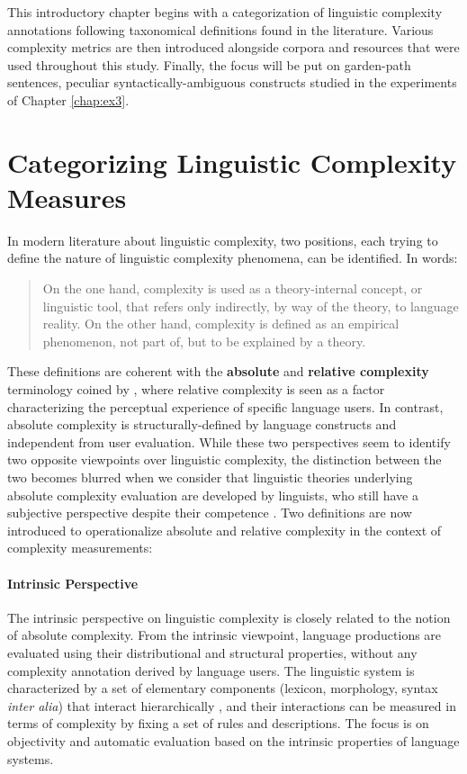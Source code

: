 \documentclass[a4paper, nobind]{templates/ociamthesis}
\begin{document}
This introductory chapter begins with a categorization of linguistic complexity annotations following taxonomical definitions found in the literature. Various complexity metrics are then introduced alongside corpora and resources that were used throughout this study. Finally, the focus will be put on garden-path sentences, peculiar syntactically-ambiguous constructs studied in the experiments of Chapter \ref{chap:ex3}.

\hypertarget{subchap:categorizing}{%
\section{Categorizing Linguistic Complexity Measures}\label{subchap:categorizing}}

In modern literature about linguistic complexity, two positions, each trying to define the nature of linguistic complexity phenomena, can be identified. In \textcite{kusters-2008-complexity} words:

\begin{quote}
On the one hand, complexity is used as a theory-internal concept, or linguistic tool, that refers only indirectly, by way of the theory, to language reality. On the other hand, complexity is defined as an empirical phenomenon, not part of, but to be explained by a theory.
\end{quote}

\noindent
These definitions are coherent with the \textbf{absolute} and \textbf{relative complexity} terminology coined by \textcite{miestamo-2004-feasibility}, where relative complexity is seen as a factor characterizing the perceptual experience of specific language users. In contrast, absolute complexity is structurally-defined by language constructs and independent from user evaluation. While these two perspectives seem to identify two opposite viewpoints over linguistic complexity, the distinction between the two becomes blurred when we consider that linguistic theories underlying absolute complexity evaluation are developed by linguists, who still have a subjective perspective despite their competence \autocite{kusters-2003-linguistic}. Two definitions are now introduced to operationalize absolute and relative complexity in the context of complexity measurements:

\paragraph{Intrinsic Perspective} The intrinsic perspective on linguistic complexity is closely related to the notion of absolute complexity. From the intrinsic viewpoint, language productions are evaluated using their distributional and structural properties, without any complexity annotation derived by language users. The linguistic system is characterized by a set of elementary components (lexicon, morphology, syntax \emph{inter alia}) that interact hierarchically \autocite{cangelosi-turner-2002-emergere}, and their interactions can be measured in terms of complexity by fixing a set of rules and descriptions. The focus is on objectivity and automatic evaluation based on the intrinsic properties of language systems.
\end{document}
